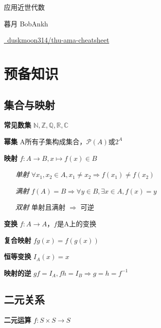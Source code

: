 \documentclass[b4paper, 10pt]{ctexart}
\newcommand*{\setN}{\mathbb{N}}
\newcommand*{\setZ}{\mathbb{Z}}
\newcommand*{\setQ}{\mathbb{Q}}
\newcommand*{\setR}{\mathbb{R}}
\newcommand*{\setC}{\mathbb{C}}
\newcommand*{\powerset}[1]{\mathscr{P}(#1)}
\newcommand*{\impl}{\Rightarrow}
\begin{document}
\begin{multicols}{3}
    \begin{center}
        {\Large 应用近世代数}

        暮月 BobAnkh

        \vspace*{-0.5em}

        \href{https://github.com/duskmoon314/thu-ama-cheatsheet}{\faGithub \  duskmoon314/thu-ama-cheatsheet}

        \vspace*{-1.5em}
    \end{center}

    \section{预备知识}

    \subsection{集合与映射}

    \textbf{常见数集} $\setN, \setZ, \setQ, \setR, \setC$

    \textbf{幂集} A所有子集构成集合，$\powerset{A}$或$2^A$

    \textbf{映射} $f: A \to B, x \mapsto f(x) \in B$

    \begin{itemize}
        \item[\emph{单射}] $\forall x_1, x_2 \!\in\! A, x_1 \!\neq\! x_2 \!\impl\! f(x_1) \!\neq\! f(x_2) $
        \item[\emph{满射}] $f(A) \! = \! B \impl \forall y \!\in\! B, \exists x \!\in\! A, f(x) = y$
        \item[\emph{双射}] 单射且满射 $\impl$ 可逆
    \end{itemize}

    \textbf{变换} $f: A \to A$，$f$是A上的变换

    \textbf{复合映射} $fg(x) = f(g(x))$

    \textbf{恒等变换} $I_A(x) = x$

    \textbf{映射的逆} $gf \! = \! I_A, fh \! = \! I_B \impl g \! = \! h \!= \! f^{-1}$

    \subsection{二元关系}

    \textbf{二元运算} $f: S \times S \to S$


\end{multicols}
\end{document}
